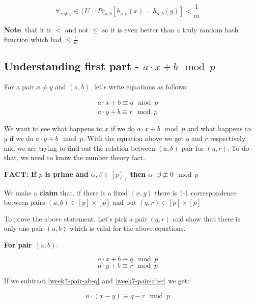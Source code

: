 \documentclass{article}
\begin{document}
$$
\forall_{x\neq y} \in [U]: Pr_{a,b} [h_{a,b}(x) = h_{a,b}(y)] < \frac{1}{m}
$$

\textbf{Note}: that it is $<$ and not $\leq$ so it is even better than a truly random hash function which had $ \leq 
 \frac{1}{m}$

 \subsection{Understanding first part - $a \cdot x + b \mod p$}

For a pair $x \neq y$ and $(a,b)$, let's write equations as follows:

\begin{align*}
    a \cdot x + b \equiv q \mod p \\
    a \cdot y + b \equiv r \mod p
\end{align*}

We want to see what happens to $x$ if we do $a \cdot x + b \mod p$ and what happens to $y$ if we do $a \cdot y + b \mod p$. With the equation above we get $q$ and $r$ respectively and we are trying to find out the relation between $(a,b)$ pair for $(q,r)$. To do that, we need to know the number theory fact.

\textbf{$\mathbf{FACT}$: If $p$ is prime and $\alpha, \beta \in {[p]}_{+}$ then $\alpha \cdot \beta \not\equiv 0 \mod p$}


We make a \textbf{claim} that, if there is a fixed $(x,y)$ there is 1-1 correspondence between pairs $(a,b) \in [p] \times [p]$ and put $(q,r) \in [p] \times [p]$

To prove the above statement. Let's pick a pair $(q,r)$ and show that there is only one pair $(a,b)$ which is valid for the above equations.

\textbf{For pair $(a,b)$}:

\begin{equation}\label{week7-pair-ab-q}
    a \cdot x + b \equiv q \mod p
\end{equation}
\begin{equation}\label{week7-pair-ab-r}
    a \cdot y + b \equiv r \mod p
\end{equation}

If we subtract \eqref{week7-pair-ab-q} and  \eqref{week7-pair-ab-r} we get:

\begin{equation}\label{week7-pair-ab-qr-sub}
    a \cdot (x-y) \equiv q - r \mod p
\end{equation}
\end{document}
